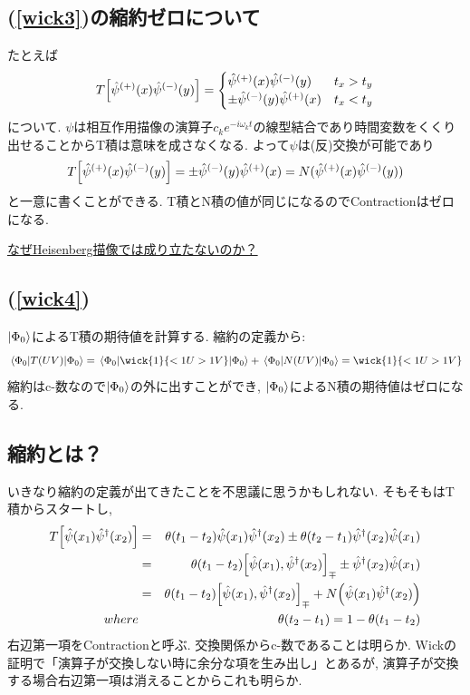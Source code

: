 \documentclass[10.5pt,a4paper]{jreport}
\newcommand{\ul}[1]{\underline{#1}}
\newcommand{\hpsi}{\hat{\psi}}
\begin{document}
\subsection{(\ref{wick3})の縮約ゼロについて}
たとえば
\begin{eqnarray}
  T\qty[\hpsi^{(+)}(x)\hpsi^{(-)}(y)] = \begin{cases}
    \hpsi^{(+)}(x)\hpsi^{(-)}(y) & t_x > t_y\\
    \pm\hpsi^{(-)}(y)\hpsi^{(+)}(x) & t_x < t_y
  \end{cases}
\end{eqnarray}
について. $\psi$は相互作用描像の演算子$c_ke^{-i\omega_k t}$の線型結合であり時間変数をくくり出せることからT積は意味を成さなくなる. よって$\psi$は(反)交換が可能であり
\begin{eqnarray}
  T\qty[\hpsi^{(+)}(x)\hpsi^{(-)}(y)] = \pm\hpsi^{(-)}(y)\hpsi^{(+)}(x) = N(\hpsi^{(+)}(x)\hpsi^{(-)}(y))
\end{eqnarray}
と一意に書くことができる. T積とN積の値が同じになるのでContractionはゼロになる.

\ul{なぜHeisenberg描像では成り立たないのか？}
\subsection{(\ref{wick4})}
$\ket{\Phi_0}$によるT積の期待値を計算する. 縮約の定義から:
\begin{eqnarray}
  \ev{T(UV)}{\Phi_0} = \ev{\wick{1}{<1U >1V}}{\Phi_0} + \ev{N(UV)}{\Phi_0} = \wick{1}{<1U >1V}
\end{eqnarray}
縮約はc-数なので$\ket{\Phi_0}$の外に出すことができ, $\ket{\Phi_0}$によるN積の期待値はゼロになる. 
\subsection{縮約とは？}
いきなり縮約の定義が出てきたことを不思議に思うかもしれない. そもそもはT積からスタートし,
\begin{eqnarray}
  T\qty[\hpsi(x_1)\hpsi^\dagger(x_2)] &=& \theta\qty(t_1 - t_2)\hpsi(x_1)\hpsi^\dagger(x_2) \pm \theta\qty(t_2 - t_1)\hpsi^\dagger(x_2)\hpsi(x_1)\\
  &=& \theta\qty(t_1 - t_2)\qty[\hpsi(x_1), \hpsi^\dagger(x_2)]_{\mp} \pm \hpsi^\dagger(x_2)\hpsi(x_1)\\
  &=& \theta\qty(t_1 - t_2)\qty[\hpsi(x_1), \hpsi^\dagger(x_2)]_{\mp} + N\qty(\hpsi(x_1)\hpsi^\dagger(x_2))\\
  \nonumber  where &&\theta\qty(t_2 - t_1) = 1 - \theta\qty(t_1 - t_2)
\end{eqnarray}
右辺第一項をContractionと呼ぶ. 交換関係からc-数であることは明らか. Wickの証明で「演算子が交換しない時に余分な項を生み出し」とあるが, 演算子が交換する場合右辺第一項は消えることからこれも明らか.
\end{document}
